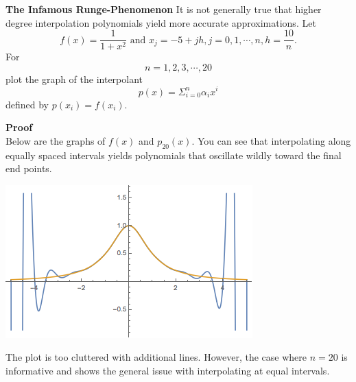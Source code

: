\textbf{The Infamous Runge-Phenomenon} It is not generally true that higher degree interpolation polynomials yield more accurate approximations. Let $$ f(x) = \frac{1}{1 + x^2} \text{ and } x_j = -5 +jh, j = 0, 1, \cdots, n, h = \frac{10}{n}.$$
For $$n = 1, 2, 3, \cdots, 20$$ plot the graph of the interpolant $$p(x) = \Sigma_{i = 0}^n \alpha_i x^i$$ defined by $p(x_i) = f(x_i).$

\textbf{Proof}\\
Below are the graphs of $f(x)$ and $p_{20}(x)$. You can see that interpolating along equally spaced intervals yields polynomials that oscillate wildly toward the final end points.

\includegraphics[scale = .5]{rungePhenomenon.png}

The plot is too cluttered with additional lines. However, the case where $n = 20$ is informative and shows the general issue with interpolating at equal intervals.
